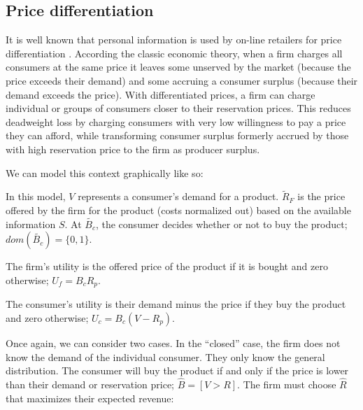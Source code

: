 \documentclass[../thesis.tex]{subfiles}
\begin{document}
\subsection{Price differentiation}
\label{sec:price-differentiation}

It is well known that personal information
is used by on-line retailers for price differentiation 
\cite{shapiro1998information, varian2001economics}.
According the classic economic theory,
when a firm charges all consumers at the same price
it leaves
some unserved by the market (because the price
exceeds their demand) and some accruing a
consumer surplus (because their demand exceeds
the price).
With differentiated prices, a firm can charge
individual or groups of consumers
closer to their reservation prices. 
This reduces deadweight loss by
charging consumers with very low willingness to pay
a price they can afford, while transforming consumer
surplus formerly accrued by those with high reservation
price to the firm as producer surplus.

We can model this context graphically like so:

\begin{center}
\end{center}

In this model, $V$ represents a consumer's demand for a product.
$\tilde{R}_F$ is the price offered by the firm for the product
(costs normalized out) based on the available information $S$.
At $\tilde{B_c}$, the consumer decides whether or not to buy
the product; $dom(\tilde{B_c}) = \{0,1\}$.

The firm's utility is the offered price of the product if
it is bought and zero otherwise; $U_f = B_c R_p$.

The consumer's utility is their demand minus the price if
they buy the product and zero otherwise; $U_c = B_c (V - R_p)$.

Once again, we can consider two cases.
In the ``closed'' case,
the firm does not know the demand of the individual
consumer.
They only know the general distribution.
The consumer will buy the product if and only if
the price is lower than their demand or reservation price;
$\hat{B} = [V > R]$.
The firm must choose $\hat{R}$ that maximizes their expected
revenue:
\end{document}
